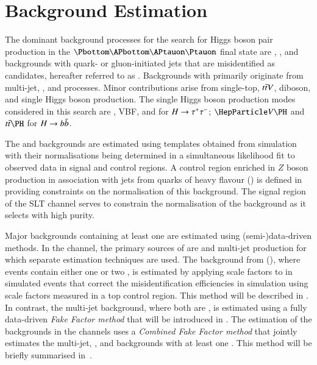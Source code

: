 \section{Background Estimation}%
\label{sec:background_estimation}

The dominant background processes for the search for Higgs boson pair
production in the $\bbtautau$ final state are \ttbar, \Zjets, and
backgrounds with quark- or gluon-initiated jets that are misidentified
as \tauhadvis candidates, hereafter referred to as \faketauhadvis.
Backgrounds with \faketauhadvis primarily originate from multi-jet,
\Wjets, and \ttbar processes. Minor contributions arise from
single-top, $t\bar{t} V$, diboson, and single Higgs boson production.
The single Higgs boson production modes considered in this search are
\ggF, VBF, \VH and \ttH for $H \to \tau^{+} \tau^{-}$; $\VH$ and $\ttH$ for
$H \to b\bar{b}$.

The \Zjets and \ttbar backgrounds are estimated using templates
obtained from simulation with their normalisations being determined in
a simultaneous likelihood fit to observed data in signal and control
regions. A control region enriched in $Z$ boson production in
association with jets from quarks of heavy flavour (\ZHF) is defined
in  providing constraints on the normalisation of
this background. The signal region of the \lephad SLT channel serves
to constrain the normalisation of the \ttbar background as it selects
\ttbar with high purity.

Major backgrounds containing at least one \faketauhad are estimated
using (semi-)data-driven methods. In the \hadhad channel, the primary
sources of \faketauhadvis are \ttbar and multi-jet production for
which separate estimation techniques are used. The \faketauhadvis
background from \ttbar (\ttbarFakes), where events contain either one
or two \faketauhadvis, is estimated by applying scale factors to
\faketauhadvis in simulated \ttbar events that correct the
\jettotauhadvis misidentification efficiencies in simulation using
scale factors measured in a top control region. This method will be
described in . In contrast, the
multi-jet background, where both \tauhadvis are \faketauhadvis, is
estimated using a fully data-driven \emph{Fake Factor method} that
will be introduced in .  The estimation of the
\faketauhadvis backgrounds in the \lephad channels uses a
\emph{Combined Fake Factor method} that jointly estimates the
multi-jet, \Wjets, and \ttbar backgrounds with at least one
\faketauhadvis. This method will be briefly summarised
in~.


